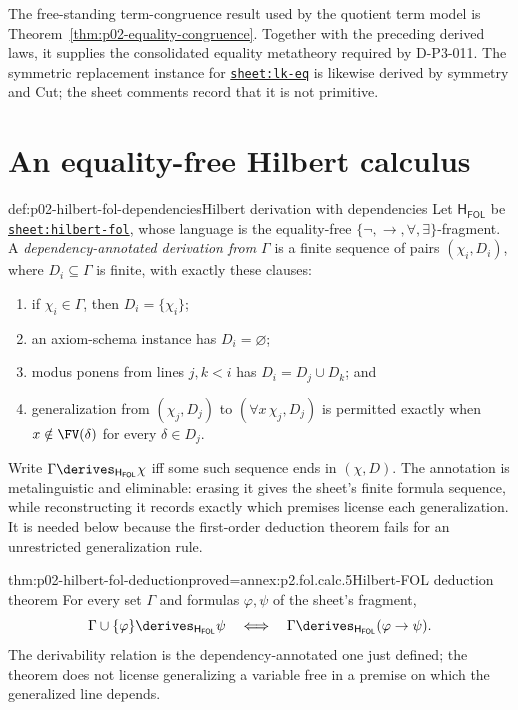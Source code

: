 The free-standing term-congruence result used by the quotient term model is
Theorem~\ref{thm:p02-equality-congruence}.  Together with the preceding
derived laws, it supplies the consolidated equality metatheory required by
D-P3-011.  The symmetric replacement instance for
\hyperref[sheet:lk-eq]{\texttt{sheet:lk-eq}} is likewise derived by symmetry
and Cut; the sheet comments record that it is not primitive.

\section{An equality-free Hilbert calculus}
\label{sec:p02-hilbert-fol}

\begin{hbdefinition}{def:p02-hilbert-fol-dependencies}{Hilbert derivation with dependencies}
Let \(\mathsf H_{\mathsf{FOL}}\) be
\hyperref[sheet:hilbert-fol]{\texttt{sheet:hilbert-fol}}, whose language is
the equality-free \(\{\neg,\to,\forall,\exists\}\)-fragment.  A
\emph{dependency-annotated derivation from \(\Gamma\)}
 is a finite sequence
of pairs \((\chi_i,D_i)\), where \(D_i\subseteq\Gamma\) is finite, with
exactly these clauses:
\begin{enumerate}
  \item if \(\chi_i\in\Gamma\), then \(D_i=\{\chi_i\}\);
  \item an axiom-schema instance has \(D_i=\varnothing\);
  \item modus ponens from lines \(j,k<i\) has
        \(D_i=D_j\cup D_k\); and
  \item generalization from \((\chi_j,D_j)\) to
        \((\forall x\,\chi_j,D_j)\) is permitted exactly when
        \(x\notin\FV(\delta)\) for every \(\delta\in D_j\).
\end{enumerate}
Write \(\Gamma\derives_{\mathsf H_{\mathsf{FOL}}}\chi\) iff some such
sequence ends in \((\chi,D)\).  The annotation is metalinguistic and
eliminable: erasing it gives the sheet's finite formula sequence, while
reconstructing it records exactly which premises license each generalization.
It is needed below because the first-order deduction theorem fails for an
unrestricted generalization rule.
\end{hbdefinition}

\begin{hbtheorem}{thm:p02-hilbert-fol-deduction}{proved=annex:p2.fol.calc.5}{Hilbert-FOL deduction theorem}
For every set \(\Gamma\) and formulas \(\varphi,\psi\) of the sheet's
fragment,
\[
 \Gamma\cup\{\varphi\}
   \derives_{\mathsf H_{\mathsf{FOL}}}\psi
 \quad\Longleftrightarrow\quad
 \Gamma\derives_{\mathsf H_{\mathsf{FOL}}}(\varphi\to\psi).
\]
The derivability relation is the dependency-annotated one just defined; the
theorem does not license generalizing a variable free in a premise on which
the generalized line depends.
\end{hbtheorem}

